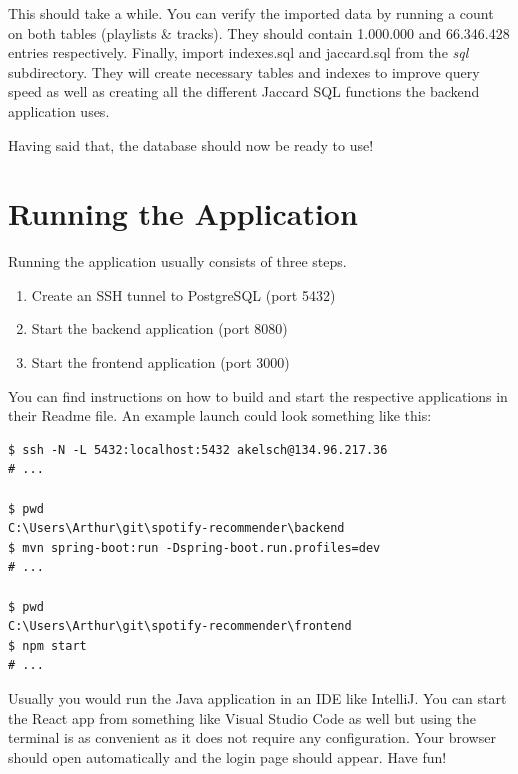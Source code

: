This should take a while. You can verify the imported data by running a count on both tables (playlists \& tracks). They should contain 1.000.000 and 66.346.428 entries respectively. Finally, import indexes.sql and jaccard.sql from the \textit{sql} subdirectory. They will create necessary tables and indexes to improve query speed as well as creating all the different Jaccard \acs{SQL} functions the backend application uses.

Having said that, the database should now be ready to use!

\section{Running the Application}

Running the application usually consists of three steps.

\begin{enumerate}
    \item Create an SSH tunnel to PostgreSQL (port 5432)
    \item Start the backend application (port 8080)
    \item Start the frontend application (port 3000)
\end{enumerate}

You can find instructions on how to build and start the respective applications in their Readme file. An example launch could look something like this:

\begin{lstlisting}[caption={Example of running the whole application}, style=Terminal]
$ ssh -N -L 5432:localhost:5432 akelsch@134.96.217.36
# ...

$ pwd
C:\Users\Arthur\git\spotify-recommender\backend
$ mvn spring-boot:run -Dspring-boot.run.profiles=dev
# ...

$ pwd
C:\Users\Arthur\git\spotify-recommender\frontend
$ npm start
# ...
\end{lstlisting}

Usually you would run the Java application in an IDE like IntelliJ. You can start the React app from something like Visual Studio Code as well but using the terminal is as convenient as it does not require any configuration. Your browser should open automatically and the login page should appear. Have fun!

